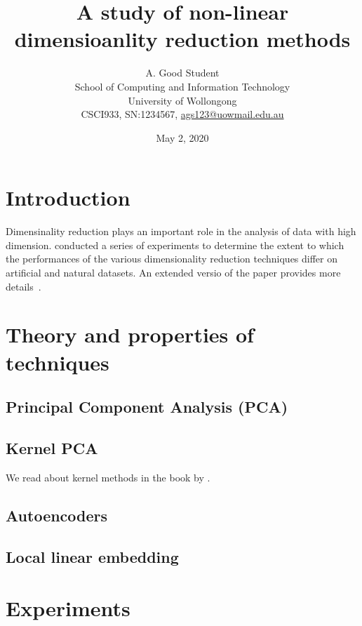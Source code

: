 \documentclass[a4paper,11pt,twocolumn]{article}
\title{A study of non-linear dimensioanlity reduction methods}
\author{A. Good Student \\
        School of Computing and Information Technology\\
        University of Wollongong\\
        CSCI933, SN:1234567, \url{ags123@uowmail.edu.au}}
\date{May 2, 2020}
\begin{document}
\onehalfspacing
{}


\section{Introduction}
\label{sec:introduction}
Dimensinality reduction plays an important role in the analysis of data with high dimension. \cite{maaten2008} conducted a series of experiments to determine the extent to which the performances of the various dimensionality reduction techniques differ on artificial and natural datasets. An extended versio of the paper provides more details~\citep{maaten2009}.
\lipsum[2]
\section{Theory and properties of techniques}
\lipsum[3]
\subsection{Principal Component Analysis (PCA)}

\lipsum[4]
\subsection{Kernel PCA}
We read about kernel methods in the book by \cite{taylor2004}.
\lipsum[1]
\subsection{Autoencoders}
\lipsum[2]
\subsection{Local linear embedding}
\lipsum[1]
\section{Experiments}
\lipsum[3]
\end{document}
